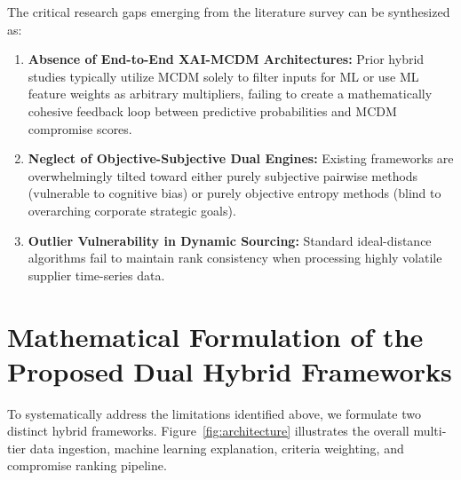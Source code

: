 \documentclass[twocolumn,10pt]{article}
\begin{document}
The critical research gaps emerging from the literature survey can be synthesized as:
\begin{enumerate}
    \item \textbf{Absence of End-to-End XAI-MCDM Architectures:} Prior hybrid studies typically utilize MCDM solely to filter inputs for ML or use ML feature weights as arbitrary multipliers, failing to create a mathematically cohesive feedback loop between predictive probabilities and MCDM compromise scores.
    \item \textbf{Neglect of Objective-Subjective Dual Engines:} Existing frameworks are overwhelmingly tilted toward either purely subjective pairwise methods (vulnerable to cognitive bias) or purely objective entropy methods (blind to overarching corporate strategic goals).
    \item \textbf{Outlier Vulnerability in Dynamic Sourcing:} Standard ideal-distance algorithms fail to maintain rank consistency when processing highly volatile supplier time-series data.
\end{enumerate}

\section{Mathematical Formulation of the Proposed Dual Hybrid Frameworks}
\label{sec:math_framework}

To systematically address the limitations identified above, we formulate two distinct hybrid frameworks. Figure~\ref{fig:architecture} illustrates the overall multi-tier data ingestion, machine learning explanation, criteria weighting, and compromise ranking pipeline.
\end{document}
